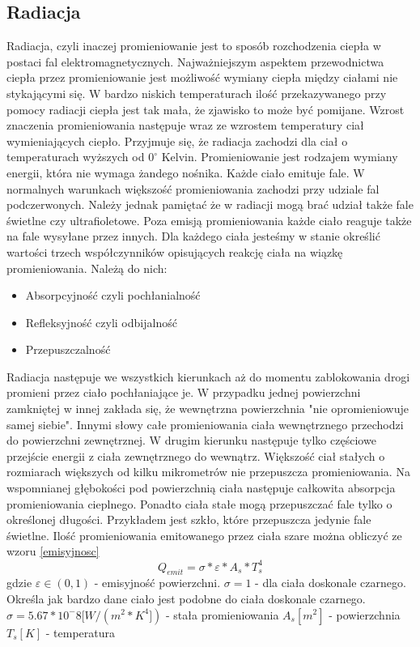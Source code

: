 \subsection {Radiacja}
Radiacja, czyli inaczej promieniowanie jest to sposób rozchodzenia ciepła w postaci fal elektromagnetycznych. 
Najważniejszym aspektem przewodnictwa ciepła przez promieniowanie jest możliwość wymiany ciepła między ciałami
nie stykającymi się.
W bardzo niskich temperaturach ilość przekazywanego przy pomocy radiacji ciepła jest tak mała, że zjawisko to może być pomijane.
Wzrost znaczenia promieniowania następuje wraz ze wzrostem temperatury ciał wymieniających ciepło.
Przyjmuje się, że radiacja zachodzi dla ciał o temperaturach wyższych od $0 ^\circ$ Kelvin.
Promieniowanie jest rodzajem wymiany energii, która nie wymaga żandego nośnika. Każde ciało emituje fale.
W normalnych warunkach większość promieniowania zachodzi przy udziale fal podczerwonych. Należy jednak pamiętać
że w radiacji mogą brać udział także fale świetlne czy ultrafioletowe. Poza emisją promieniowania każde ciało reaguje także
na fale wysyłane przez innych. Dla każdego ciała jesteśmy w stanie określić wartości trzech współczynników opisujących 
reakcję ciała na wiązkę promieniowania. Należą do nich:
\begin {itemize}
\item Absorpcyjność czyli pochłanialność
\item Refleksyjność czyli odbijalność
\item Przepuszczalność
\end {itemize}
Radiacja następuje we wszystkich kierunkach aż  do momentu zablokowania drogi promieni przez ciało pochłaniające je.
W przypadku jednej powierzchni zamkniętej w innej zakłada się, że wewnętrzna powierzchnia "nie opromieniowuje samej siebie".
Innymi słowy całe promieniowania ciała wewnętrznego przechodzi do powierzchni zewnętrznej. W drugim kierunku następuje tylko częściowe
przejście energii z ciała zewnętrznego do wewnątrz.
Większość ciał stałych o rozmiarach większych od kilku mikrometrów nie przepuszcza promieniowania. Na wspomnianej 
głębokości pod powierzchnią ciała następuje całkowita absorpcja promieniowania cieplnego. Ponadto ciała stałe mogą przepuszczać
fale tylko o określonej długości. Przykładem jest szkło, które przepuszcza jedynie fale świetlne.
Ilość promieniowania emitowanego przez ciała szare można obliczyć ze wzoru \ref{emisyjnosc}
\begin {equation}
Q_{emit}=\sigma*\varepsilon*A_{s}*T_{s}^4
\label {emisyjnosc}
\end {equation}
gdzie
$\varepsilon \in (0,1)$ - emisyjność powierzchni. $\sigma=1$ - dla ciała doskonale czarnego. Określa jak bardzo dane 
ciało jest podobne do ciała doskonale czarnego.
$\sigma = 5.67 * 10^-8 [W/(m^2 * K^4]) $ - stała promieniowania
$A_{s} [m^2]$ - powierzchnia 
$T_{s} [K]$ - temperatura




